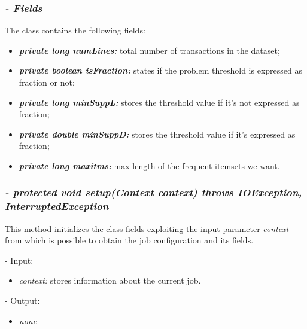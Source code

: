 \documentclass[]{report}
\begin{document}
	\subsubsection*{\textit{\textbf{-} Fields}} 
	The class contains the following fields:
	\begin{itemize}
		\item \textit{\textbf{private long numLines:}} total number of transactions in the dataset;
		\item \textit{\textbf{private boolean isFraction:}} states if the problem threshold is expressed as fraction or not;
		\item \textit{\textbf{private long minSuppL:}} stores the threshold value if it's not expressed as fraction; 
		\item \textit{\textbf{private double minSuppD:}} stores the threshold value if it's expressed as fraction;
		\item \textit{\textbf{private long maxitms:}} max length of the frequent itemsets we want.	
	\end{itemize}
	
	\subsubsection*{\textit{\textbf{-} protected void setup(Context context) throws IOException, InterruptedException}}   	
	This method initializes the class fields exploiting the input parameter \textit{context} from which is possible to obtain the job configuration and its fields.  
	\begin{description}
		\item - Input:
		\begin{itemize}
			\item \textit{context:} stores information about the current job.
		\end{itemize}
	\end{description}	
	\begin{description}
		\item - Output:
		\begin{itemize}
			\item \textit{none} 
		\end{itemize}
	\end{description}
	
\end{document}
